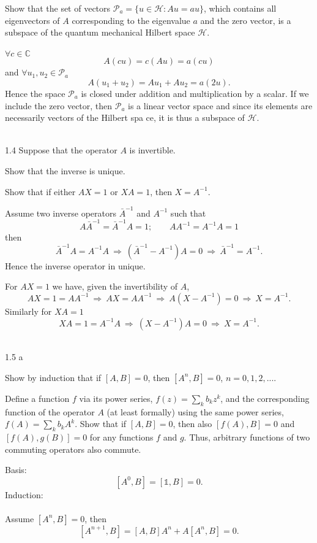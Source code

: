 \documentclass[10pt,letterpaper]{article}
\begin{document}
	Show that the set of vectors $\mathscr{P}_a = \{ u\in \mathscr H: Au = au\}$, which contains all 
	eigenvectors of $A$ corresponding to the eigenvalue $a$ and the zero vector, is a subspace of the
	quantum mechanical Hilbert space $\mathscr H$. 
	\\ \\
	$\forall c \in \mathbb C$
	\[
		A(cu) = c(Au) = a(cu)
	\] 
	and $\forall u_1,u_2 \in \mathscr P_a$
	\[
		A(u_1+u_2) = Au_1 + Au_2 = a(2u).
	\]
	Hence the space $\mathscr P_a$ is closed under addition and multiplication by a scalar. If we include the 
	zero vector, then $\mathscr{P}_a$ is a linear vector space and since its elements are necessarily vectors
	of the Hilbert spa
	ce, it is thus a subspace of $\mathscr H$. \\ \\ 
	\item[1.4]
	Suppose that the operator $A$ is invertible. 
	
	\benum
	\item 
	Show that the inverse is unique.
	\item
	Show that if either $AX=1$ or $XA = 1$, then $X=A^{-1}$. 
	\\
	\eenum
	
	\benum
	\item
	Assume two inverse operators $\bar A^{-1}$ and $A^{-1}$ such that
	\[
		A\bar A^{-1} = \bar A^{-1} A = 1;\qquad AA^{-1} = A^{-1}A = 1
	\]
	then
	\[
		 \bar A^{-1} A  = A^{-1}A  \ \Rightarrow\   (\bar A^{-1}- A^{-1})A = 0 \ \Rightarrow\   \bar A^{-1} =  A^{-1} .
	\]
	Hence the inverse operator in unique. \\
	
	\item
	For $AX = 1$ we have, given the invertibility of $A$,
	\[
		AX = 1 = AA^{-1}\ \Rightarrow\ AX = AA^{-1}\ \Rightarrow\ A(X-A^{-1}) = 0
		\ \Rightarrow\ X = A^{-1}.
	\]
	Similarly for $XA = 1$
	\[
		XA = 1 = A^{-1}A \ \Rightarrow\ (X-A^{-1})A = 0\ \Rightarrow\ X = A^{-1}.
	\] \\
	\eenum
	\item[1.5]
	a
	\benum
	\item
	Show by induction that if $[A,B] = 0$, then $[A^n,B] = 0$, $n= 0,1,2,...$. 
	\item
	Define a function $f$ via its power series, $f(z) = \sum_k b_kz^k$, and the corresponding function of the 
	operator $A$ (at least formally) using the same power series, $f(A) = \sum_k b_kA^k$. Show that if $[A,B]=0$,
	then also $[f(A),B] = 0$ and $[f(A),g(B)] = 0$ for any functions $f$ and $g$. Thus, arbitrary functions of two
	commuting operators also commute. 
	\eenum 
	\benum
	\item
	Basis:
	\[
		[A^0,B] = [\mathds 1,B] = 0.
	\]
	Induction:
	\\ \\
	Assume $[A^n,B]=0$, then
	\[
		[A^{n+1},B] = [A,B]A^n + A[A^n,B] = 0.
	\]
	
\end{document}
